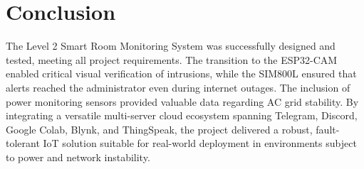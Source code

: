 \documentclass[12pt,a4paper]{article}
\begin{document}
\begin{table}[H]
\centering
\caption{Estimated Bill of Materials (BOM) and Cost Analysis for 100-Unit Deployment (Deliverable 4)}
\label{tab:bom}
\end{table}

\section{Conclusion}
The Level 2 Smart Room Monitoring System was successfully designed and tested, meeting all project requirements. The transition to the ESP32-CAM enabled critical visual verification of intrusions, while the SIM800L ensured that alerts reached the administrator even during internet outages. The inclusion of power monitoring sensors provided valuable data regarding AC grid stability. By integrating a versatile multi-server cloud ecosystem spanning Telegram, Discord, Google Colab, Blynk, and ThingSpeak, the project delivered a robust, fault-tolerant IoT solution suitable for real-world deployment in environments subject to power and network instability.
\end{document}
